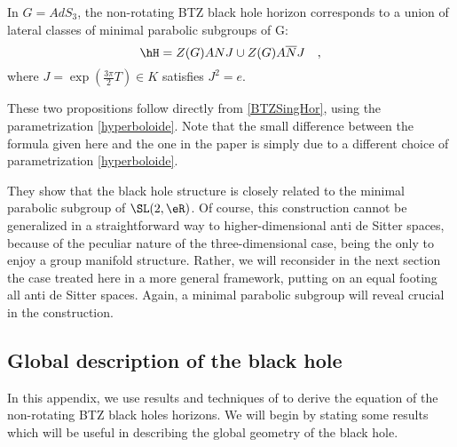 \begin{proposition}		\label{PropLatClassANSLdeuxR}
	In $G=AdS_3$, the non-rotating BTZ black hole horizon corresponds to a union of lateral classes of minimal parabolic subgroups of G:
	\begin{equation}		\label{EqHorClassLatdeux}
		\hH = Z(G) A N J \cup Z(G) A \overline{N} J \quad,
	\end{equation}
	where $J=\exp(\frac{3\pi}{2}T) \in K$ satisfies $J^2 = e$.
	\label{BTZHor}
\end{proposition}

These two propositions follow directly from \eqref{BTZSingHor}, using the parametrization \eqref{hyperboloide}. Note that the small difference between the formula given here and the one in the paper \cite{Keio} is simply due to a different choice of parametrization \eqref{hyperboloide}.

They show that the black hole structure is closely related to the minimal parabolic subgroup of $\SL(2,\eR)$. Of course, this construction cannot be generalized in a straightforward way to higher-dimensional anti de Sitter spaces, because of the peculiar nature of the three-dimensional case, being the only to enjoy a group manifold structure. Rather, we will reconsider in the next section the case treated here in a more general framework, putting on an equal footing all anti de Sitter spaces. Again, a minimal parabolic subgroup will reveal crucial in the construction.

\subsection{Global description of the black hole}

In this appendix, we use results and techniques of \cite{BTZB_un,BTZB_deux,Keio,Clement} to derive the equation of the non-rotating BTZ black holes horizons. We will begin by stating some results which will be useful in describing the global geometry of the black hole.

